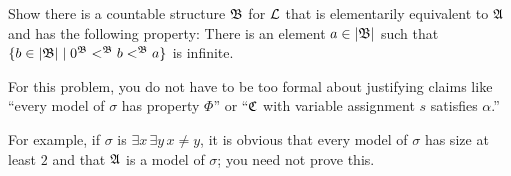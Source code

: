 \begin{problem}
  Show there is a countable structure $\mathfrak{B}$ for $\mathcal{L}$
  that is elementarily equivalent to $\mathfrak{A}$
  and has the following property:
  There is an element $a \in \lvert\mathfrak B\rvert$ such that
  $\{ b \in \lvert\mathfrak B\rvert \mid 0^{\mathfrak{B}} <^{\mathfrak{B}} b <^{\mathfrak{B}} a \}$
  is infinite.

  \step
  For this problem, you do not have to be too formal about
  justifying claims like
  ``every model of $\sigma$ has property $\Phi$'' or
  ``$\mathfrak{C}$ with variable assignment $s$ satisfies $\alpha$.''
  
  \step
  For example, if $\sigma$ is $\exists x \, \exists y \, x \neq y$,
  it is obvious that every model of $\sigma$ has size at least $2$
  and that $\mathfrak{A}$ is a model of $\sigma$; you need not prove this.

  \begin{Answer}
    
  \end{Answer}
\end{problem}
